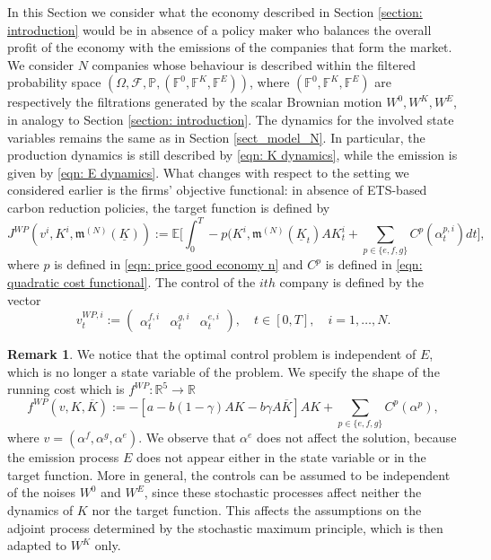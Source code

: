 \documentclass[11pt,twoside]{amsart}
\theoremstyle{definition}
\newtheorem{remark}[theorem]{Remark}
\numberwithin{equation}{section}
\newcommand{\E}{\mathbb{E}}
\newcommand{\F}{\mathbb{F}}
\newcommand{\R}{\mathbb{R}}
\newcommand{\ItF}{\mathcal{F}}
\newcommand{\prob}{\mathbb{P}}
\renewcommand{\bar}{\overline}
\begin{document}
In this Section we consider what the economy described in Section \ref{section: introduction} would be in absence of a policy maker who balances the overall profit of the economy with the emissions of the companies that form the market. 
We consider $N$ companies whose behaviour is described within the filtered probability space $(\Omega, \ItF, \prob, (\F^0, \F^K, \F^E))$, where $(\F^0, \F^K, \F^E)$ are respectively the filtrations generated by the scalar Brownian motion $W^0, W^K, W^E$, in analogy to Section \ref{section: introduction}. The dynamics for the involved state variables remains the same as in Section \ref{sect_model_N}. In particular, the production dynamics is still described by \eqref{eqn: K dynamics}, while the emission is given by \eqref{eqn: E dynamics}. 
What changes with respect to the setting we considered earlier is the firms' objective functional: in absence of ETS-based carbon reduction policies, the target function is defined by
\begin{equation*}
    J^{WP}(v^i, K^i, \mathfrak{m}^{(N)}(\underline{K})) := \E \bigg[ \int_0^T - p(K^i, \mathfrak{m}^{(N)}(\underline{K}_t)AK^i_t + \sum_{p\in\{e,f,g\}} C^p(\alpha^{p,i}_t)dt\bigg], 
\end{equation*}
where $p$ is defined in \eqref{eqn: price good economy n} and $C^p$ is defined in \eqref{eqn: quadratic cost functional}. The control of the $ith$ company is defined by the vector
\begin{equation*}
    v^{WP,i}_t := \begin{pmatrix}
        \alpha^{f,i}_t & \alpha^{g,i}_t & \alpha^{e,i}_t
    \end{pmatrix}, \quad t \in [0,T], \quad i=1,\dots, N.
\end{equation*}
\begin{remark}
\label{rmk: on the measurability of wp problem}
We notice that the optimal control problem is independent of $E$, which is no longer a state variable of the problem. We specify the shape of the running cost which is $f^{WP}:\R^5\to\R$
\begin{equation*}
    f^{WP}(v, K ,\bar{K}):= -[a-b(1-\gamma)AK - b\gamma A\bar{K}]AK + \sum_{p \in \{e,f,g\}}C^p(\alpha^p),
\end{equation*}
where $v=(\alpha^f, \alpha^g, \alpha^e)$. We observe that $\alpha^e$ does not affect the solution, because the emission process $E$ does not appear either in the state variable or in the target function. More in general, the controls can be assumed to be independent of the noises $W^0$ and $W^E$, since these stochastic processes affect neither the dynamics of $K$ nor the target function. This affects the assumptions on the adjoint process determined by the stochastic maximum principle, which is then adapted to $W^K$ only.
\end{remark}
\end{document}
